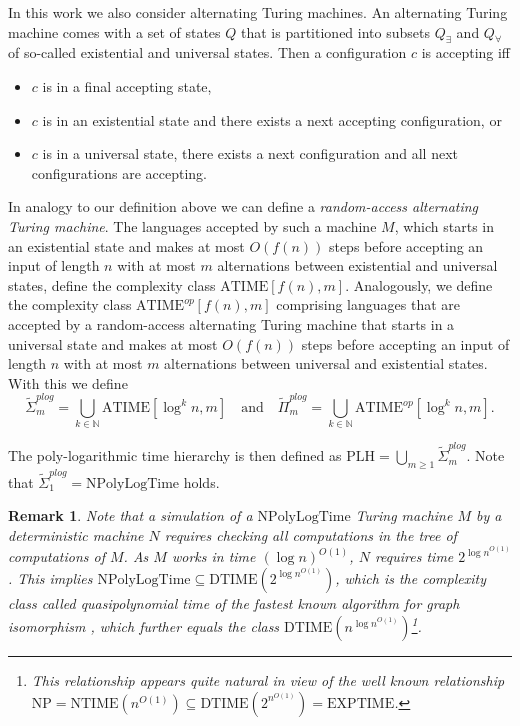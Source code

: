 \documentclass{article}
\newtheorem{remark}{Remark}
\newcommand{\npolylog}{\mathrm{NPolyLogTime}}
\begin{document}
In this work we also consider alternating Turing machines. An alternating Turing machine comes with a set of states $Q$ that is partitioned into subsets $Q_\exists$ and $Q_\forall$ of so-called existential and universal states. Then a configuration $c$ is accepting iff
\begin{itemize}

\item $c$ is in a final accepting state,

\item $c$ is in an existential state and there exists a next accepting configuration, or

\item $c$ is in a universal state, there exists a next configuration and all next configurations are accepting.

\end{itemize}

In analogy to our definition above we can define a \emph{random-access alternating Turing machine}. The languages accepted by such a machine $M$, which starts in an existential state and makes at most $O(f(n))$ steps before accepting an input of length $n$ with at most $m$ alternations between existential and universal states, define the complexity class $\mathrm{ATIME}[f(n),m]$. Analogously, we define the complexity class $\mathrm{ATIME}^{op}[f(n),m]$ comprising languages that are accepted by a random-access alternating Turing machine that starts in a universal state and makes at most $O(f(n))$ steps before accepting an input of length $n$ with at most $m$ alternations between universal and existential states. With this we define
\[ \tilde{\Sigma}_m^{\mathit{plog}} = \bigcup_{k \in \mathbb{N}} \mathrm{ATIME}[\log^k n,m] \quad \text{and} \quad \tilde{\Pi}_m^{\mathit{plog}} = \bigcup_{k \in \mathbb{N}} \mathrm{ATIME}^{op}[\log^k n,m] . \]

The poly-logarithmic time hierarchy is then defined as $\mathrm{PLH} = \bigcup_{m \ge 1} \tilde{\Sigma}_m^{\mathit{plog}}$. Note that $\tilde{\Sigma}_1^{\mathit{plog}} = \npolylog$ holds. 

\begin{remark}

Note that a simulation of a $\npolylog$ Turing machine $M$ by a deterministic machine $N$ requires checking all computations in the tree of computations of $M$. As $M$ works in time $({\log n})^{O(1)}$, $N$ requires time $2^{{\log n}^{O(1)}}$. This implies $\npolylog \subseteq \mathrm{DTIME}(2^{{\log n}^{O(1)}})$, which is the complexity class called quasipolynomial time of the fastest known algorithm for graph isomorphism \cite{babai:stoc2016}, which further equals the class  
$\mathrm{DTIME}({n^{{\log n}^{O(1)}}})$\footnote{This relationship appears quite natural in view of the well known relationship $\mathrm{NP} = \mathrm{NTIME}(n^{O(1)}) \subseteq \mathrm{DTIME}(2^{{n}^{O(1)}}) = \mathrm{EXPTIME}$.}.

\end{remark}
\end{document}
